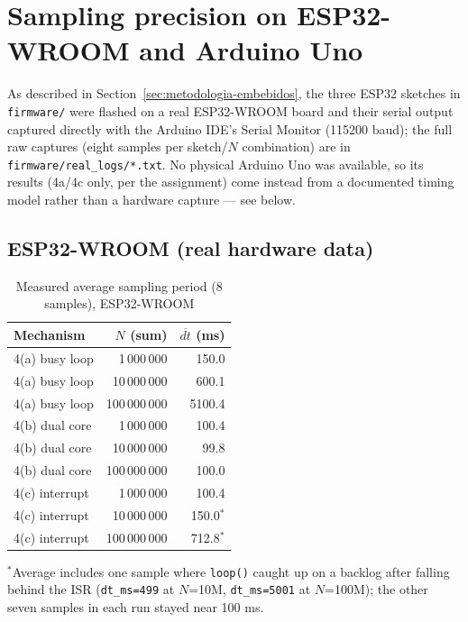
\section{Sampling precision on ESP32-WROOM and Arduino Uno}
\label{sec:embebidos}

As described in Section~\ref{sec:metodologia-embebidos}, the three ESP32 sketches in \texttt{firmware/} were flashed on a real ESP32-WROOM board and their serial output captured directly with the Arduino IDE's Serial Monitor (115200 baud); the full raw captures (eight samples per sketch/$N$ combination) are in \texttt{firmware/real\_logs/*.txt}. No physical Arduino Uno was available, so its results (4a/4c only, per the assignment) come instead from a documented timing model rather than a hardware capture — see below.

\subsection{ESP32-WROOM (real hardware data)}

\begin{table}[!t]
\centering
\caption{Measured average sampling period (8 samples), ESP32-WROOM}
\label{tab:embebidos}
\small
\begin{tabular}{@{}l r r@{}}
\toprule
Mechanism & $N$ (sum) & $\overline{dt}$ (ms) \\
\midrule
4(a) busy loop & 1\,000\,000 & 150.0 \\
4(a) busy loop & 10\,000\,000 & 600.1 \\
4(a) busy loop & 100\,000\,000 & 5100.4 \\
\midrule
4(b) dual core & 1\,000\,000 & 100.4 \\
4(b) dual core & 10\,000\,000 & 99.8 \\
4(b) dual core & 100\,000\,000 & 100.0 \\
\midrule
4(c) interrupt & 1\,000\,000 & 100.4 \\
4(c) interrupt & 10\,000\,000 & 150.0$^{*}$ \\
4(c) interrupt & 100\,000\,000 & 712.8$^{*}$ \\
\bottomrule
\end{tabular}

\vspace{2pt}
{\footnotesize $^{*}$Average includes one sample where \texttt{loop()} caught up on a backlog after falling behind the ISR (\texttt{dt\_ms=499} at $N$=10M, \texttt{dt\_ms=5001} at $N$=100M); the other seven samples in each run stayed near 100 ms.}
\end{table}

